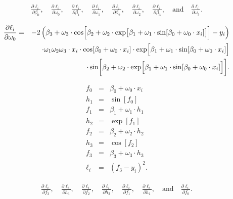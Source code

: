 \documentclass[letterpaper,twoside,openany, titlepage,oldfontcommands,titles,dvipsnames]{memoir}
\begin{document}
\begin{eqnarray}
 \frac{\partial \ell_i}{\partial \beta_{0}}, \quad \frac{\partial \ell_i}{\partial \omega_0}, \quad \frac{\partial \ell_i}{\partial \beta_{1}}, \quad \frac{\partial \ell_i}{\partial \omega_1}, \quad
 \frac{\partial \ell_i}{\partial \beta_{2}}, \quad \frac{\partial \ell_i}{\partial \omega_{2}}, \quad \frac{\partial \ell_i}{\partial \beta_{3}}, \quad\mbox{and} \quad \frac{\partial \ell_i}{\partial \omega_{3}}.
 \end{eqnarray}

\begin{eqnarray}\label{eq:train2_complicated_deriv}
 \frac{\partial \ell_i}{\partial \omega_{0}} &=& -2 \left( \beta_3+\omega_3\cdot\cos\Bigl[\beta_2+\omega_2\cdot\exp\bigl[\beta_1+\omega_1\cdot\sin[\beta_0+\omega_0\cdot x_i]\bigr]\Bigr]-y_i\right)\nonumber \\
 &&\hspace{0.5cm}\cdot \omega_1\omega_2\omega_3\cdot x_i\cdot\cos[\beta_0+\omega_0 \cdot x_i]\cdot\exp\Bigl[\beta_1 + \omega_1 \cdot \sin[\beta_0+\omega_0\cdot x_i]\Bigr]\nonumber\\
 && \hspace{1cm}\cdot \sin\biggl[\beta_2+\omega_2\cdot \exp\Bigl[\beta_1 + \omega_1 \cdot \sin[\beta_0+\omega_0\cdot x_i]\Bigr]\biggr].
 \end{eqnarray}

\begin{eqnarray}
 f_{0} &=& \beta_{0} + \omega_{0}\cdot x_i\nonumber\\
 h_{1} &=& \sin[f_{0}]\nonumber\\
 f_{1} &=& \beta_{1} + \omega_{1}\cdot h_{1}\nonumber\\
 h_{2} &=& \exp[f_{1}]\nonumber\\
 f_{2} &=& \beta_{2} + \omega_{2} \cdot h_{2}\nonumber\\
 h_{3} &=& \cos[f_{2}]\nonumber\\
 f_{3} &=& \beta_{3} + \omega_{3}\cdot h_{3}\nonumber\\
 \ell_{i} &=& (f_{3}-y_{i})^2.
 \end{eqnarray}

\begin{eqnarray}
 \frac{\partial \ell_i}{\partial f_{3}}, \quad \frac{\partial \ell_i}{\partial h_3}, \quad \frac{\partial \ell_i}{\partial f_2}, \quad
 \frac{\partial \ell_i}{\partial h_2}, \quad \frac{\partial \ell_i}{\partial f_1}, \quad \frac{\partial \ell_i}{\partial h_1}, \quad\mbox{and} \quad \frac{\partial \ell_i}{\partial f_0}.
 \end{eqnarray}
\end{document}
